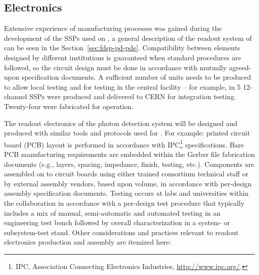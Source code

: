 \subsection{Electronics}
\label{sec:fdsp-pd-assy-pde}

Extensive experience of manufacturing processes was gained during the development of the SSPs used on , a general description of the readout system of  can be seen in the Section~\ref{sec:fdsp-pd-pde}. Compatibility between elements designed by different institutions is guaranteed when standard procedures are followed, so the circuit design must be done in accordance with mutually agreed-upon specification documents.  A sufficient  number of units needs to be produced to allow local testing and for testing in the central facility -- for example, in  \num{5} 12-channel  SSPs were produced and delivered to CERN for integration testing. Twenty-four were fabricated for  operation. 

The readout electronics of the photon detection system will be designed and produced with similar tools and protocols used for  . For example: printed circuit board (PCB) layout is performed in accordance with IPC\footnote{IPC\texttrademark{}, Association Connecting Electronics Industries, \url{http://www.ipc.org/}.} specifications. Bare PCB manufacturing requirements are embedded within the Gerber file fabrication documents (e.g., layers, spacing, impedance, finish, testing, etc.). Components are assembled on to circuit boards using either trained  consortium technical staff or by external assembly vendors, based upon volume, in accordance with per-design assembly specification documents. Testing occurs at labs and universities within the collaboration in accordance with a per-design test procedure that typically includes a mix of manual, semi-automatic and automated testing in an engineering test bench followed by overall characterization in a system- or subsystem-test stand.
Other considerations and practices relevant to readout electronics production and assembly are itemized here:

